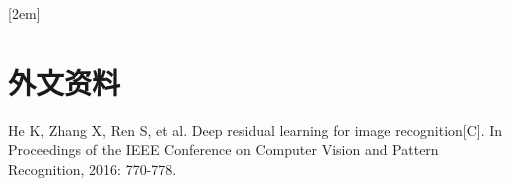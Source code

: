 
[2em]{\vspace{.5\baselineskip}\xiaosan\song}
             {\prechaptername\CJKnumber{\thecontentslabel}\postchaptername\qquad}{}
             {}             %
\chapter*{外文资料}
\lhead{}
\rhead{}
\chead{}
\lfoot{}
\cfoot{}
\rfoot{}

\noindent
{He K, Zhang X, Ren S, et al. Deep residual learning for image recognition[C]. In Proceedings of the IEEE Conference on Computer Vision and Pattern Recognition, 2016: 770-778.}

\thispagestyle{empty}
\newpage




